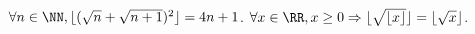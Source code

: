 %
%
		\begin{tasks}
			\task \Mq $\forall n \in \NN, \lfloor ( \sqrt{n} + \sqrt{n+1})^2 \rfloor = 4n +1$.
 			\task \Mq  $\forall x \in \RR, x \ge 0 \Rightarrow \lfloor \sqrt{\lfloor x \rfloor}\rfloor = \lfloor \sqrt{x} \rfloor$.
 	\end{tasks}
